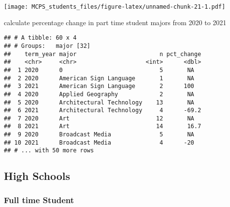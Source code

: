 \documentclass[]{article}
\newenvironment{Shaded}{\begin{snugshade}}{\end{snugshade}}
\newcommand{\DataTypeTok}[1]{\textcolor[rgb]{0.13,0.29,0.53}{#1}}
\newcommand{\DecValTok}[1]{\textcolor[rgb]{0.00,0.00,0.81}{#1}}
\newcommand{\KeywordTok}[1]{\textcolor[rgb]{0.13,0.29,0.53}{\textbf{#1}}}
\newcommand{\NormalTok}[1]{#1}
\newcommand{\OperatorTok}[1]{\textcolor[rgb]{0.81,0.36,0.00}{\textbf{#1}}}
\newcommand{\OtherTok}[1]{\textcolor[rgb]{0.56,0.35,0.01}{#1}}
\newcommand{\StringTok}[1]{\textcolor[rgb]{0.31,0.60,0.02}{#1}}
\begin{document}
\texttt{[image: MCPS\_students\_files/figure-latex/unnamed-chunk-21-1.pdf]}

calculate percentage change in part time student majors from 2020 to
2021

\begin{Shaded}
\end{Shaded}

\begin{verbatim}
## # A tibble: 60 x 4
## # Groups:   major [32]
##    term_year major                        n pct_change
##    <chr>     <chr>                    <int>      <dbl>
##  1 2020      0                            5       NA  
##  2 2020      American Sign Language       1       NA  
##  3 2021      American Sign Language       2      100  
##  4 2020      Applied Geography            2       NA  
##  5 2020      Architectural Technology    13       NA  
##  6 2021      Architectural Technology     4      -69.2
##  7 2020      Art                         12       NA  
##  8 2021      Art                         14       16.7
##  9 2020      Broadcast Media              5       NA  
## 10 2021      Broadcast Media              4      -20  
## # ... with 50 more rows
\end{verbatim}

\hypertarget{high-schools}{%
\subsection{High Schools}\label{high-schools}}

\hypertarget{full-time-student}{%
\subsubsection{Full time Student}\label{full-time-student}}
\end{document}
